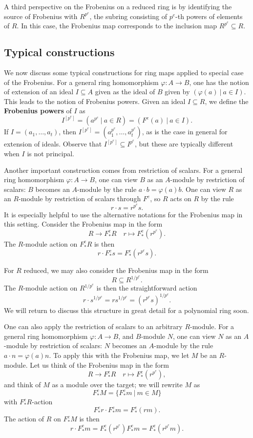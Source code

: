 \documentclass[12pt]{amsart}
\theoremstyle{definition}
\numberwithin{equation}{theorem}
\def\phi{\varphi}
\def\to{\longrightarrow}
\def\mapsto{\longmapsto}
\begin{document}
A third perspective on the Frobenius on a reduced ring is by identifying the source of Frobenius with $R^{p^e}$, the subring consisting of $p^e$-th powers of elements of $R$. In this case, the Frobenius map corresponds to the inclusion map $R^{p^e} \subseteq R$. 

\subsection*{Typical constructions}
We now discuss some typical constructions for ring maps applied to special case of the Frobenius. For a general ring homomorphism $\phi:A\to B$, one has the notion of extension of an ideal $I\subseteq A$ given as the ideal of $B$ given by $(\phi(a) \ | \ a\in I)$. This leads to the notion of Frobenius powers. Given an ideal $I\subseteq R$, we define the \textbf{Frobenius powers} of $I$ as
\[ I^{[p^e]} = ( a^{p^e} \ | \ a\in R) = (F^{e}(a) \ | \ a\in I).\]
If $I=(a_1,\dots,a_t)$, then $I^{[p^e]} = (a_1^{p^e}, \dots,a_t^{p^e})$, as is the case in general for extension of ideals. Observe that $I^{[p^e]} \subseteq I^{p^e}$, but these are typically different when $I$ is not principal.

Another important construction comes from restriction of scalars. For a general ring homomorphism $\phi:A\to B$, one can view $B$ as an $A$-module by restriction of scalars: $B$ becomes an $A$-module by the rule $a \cdot b = \phi(a)b$. One can view $R$ as an $R$-module by restriction of scalars through $F^e$, so $R$ acts on $R$ by the rule
\[ r \cdot s = r^{p^e}s.\]
It is especially helpful to use the alternative notations for the Frobenius map in this setting. Consider the Frobenius map in the form
\[ R \to F^e_*R \quad r\mapsto F^e_*(r^{p^e}).\]
The $R$-module action on $F^e_*R$ is then
\[ r \cdot F^e_*s = F^e_*(r^{p^e}s).\]

For $R$ reduced, we may also consider the Frobenius map in the form
\[ R\subseteq R^{1/p^e}.\]
The $R$-module action on $R^{1/p^e}$ is then the straightforward action
\[ r \cdot s^{1/p^e} =r s^{1/p^e} = (r^{p^e}s)^{1/p^e}.\]
We will return to discuss this structure in great detail for a polynomial ring soon.

One can also apply the restriction of scalars to an arbitrary $R$-module. For a general ring homomorphism $\phi:A\to B$, and $B$-module $N$, one can view $N$ as an $A$-module by restriction of scalars: $N$ becomes an $A$-module by the rule $a \cdot n = \phi(a)n$. To apply this with the Frobenius map, we let $M$ be an $R$-module. Let us think of the Frobenius map in the form
\[ R \to F^e_*R \quad r\mapsto F^e_*(r^{p^e}),\]
and think of $M$ as a module over the target; we will rewrite $M$ as
\[ F^e_*M =\{ F^e_*m \ | \ m\in M\}\]
with $F^e_*R$-action
\[ F^e_* r \cdot F^e_* m = F^e_* (rm).\]
The action of $R$ on $F^e_*M$ is then
\[ r \cdot F^e_*m = F^e_*(r^{p^e}) F^e_*m = F^e_*(r^{p^e}m).\]
\end{document}
